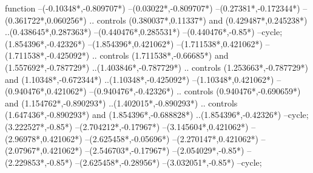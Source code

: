 {\begin{scope}[x=1mm,y=1mm,line width=\SCstroke mm,line cap=round,line join=round]
\begin{SCpart}{function}
--({-0.10348*\SCF},{-0.809707*\SCF})
--({0.03022*\SCF},{-0.809707*\SCF})
--({0.27381*\SCF},{-0.172344*\SCF})
--({0.361722*\SCF},{0.060256*\SCF})
.. controls ({0.380037*\SCF},{0.11337*\SCF}) and ({0.429487*\SCF},{0.245238*\SCF}) ..({0.438645*\SCF},{0.287363*\SCF})
--({0.440476*\SCF},{0.285531*\SCF})
--({0.440476*\SCF},{-0.85*\SCF})
--cycle;
 ({1.854396*\SCF},{-0.42326*\SCF})
--({1.854396*\SCF},{0.421062*\SCF})
--({1.711538*\SCF},{0.421062*\SCF})
--({1.711538*\SCF},{-0.425092*\SCF})
.. controls ({1.711538*\SCF},{-0.66685*\SCF}) and ({1.557692*\SCF},{-0.787729*\SCF}) ..({1.403846*\SCF},{-0.787729*\SCF})
.. controls ({1.253663*\SCF},{-0.787729*\SCF}) and ({1.10348*\SCF},{-0.672344*\SCF}) ..({1.10348*\SCF},{-0.425092*\SCF})
--({1.10348*\SCF},{0.421062*\SCF})
--({0.940476*\SCF},{0.421062*\SCF})
--({0.940476*\SCF},{-0.42326*\SCF})
.. controls ({0.940476*\SCF},{-0.690659*\SCF}) and ({1.154762*\SCF},{-0.890293*\SCF}) ..({1.402015*\SCF},{-0.890293*\SCF})
.. controls ({1.647436*\SCF},{-0.890293*\SCF}) and ({1.854396*\SCF},{-0.688828*\SCF}) ..({1.854396*\SCF},{-0.42326*\SCF})
--cycle;
 ({3.222527*\SCF},{-0.85*\SCF})
--({2.704212*\SCF},{-0.17967*\SCF})
--({3.145604*\SCF},{0.421062*\SCF})
--({2.96978*\SCF},{0.421062*\SCF})
--({2.625458*\SCF},{-0.05696*\SCF})
--({2.270147*\SCF},{0.421062*\SCF})
--({2.07967*\SCF},{0.421062*\SCF})
--({2.546703*\SCF},{-0.17967*\SCF})
--({2.054029*\SCF},{-0.85*\SCF})
--({2.229853*\SCF},{-0.85*\SCF})
--({2.625458*\SCF},{-0.28956*\SCF})
--({3.032051*\SCF},{-0.85*\SCF})
--cycle;
\end{SCpart}
\end{scope}
}
